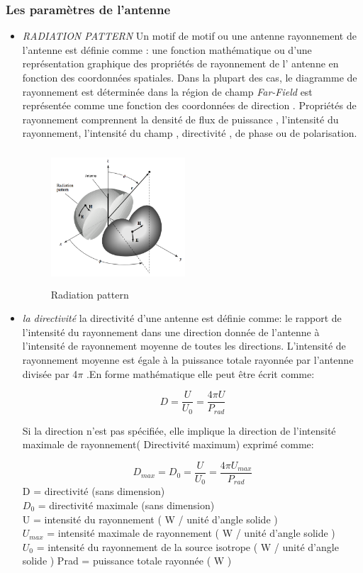 \documentclass[11pt, a4paper, twoside]{book}
\begin{document}
\subsubsection{Les paramètres de l'antenne}
\begin{itemize}
\item \emph{RADIATION PATTERN}
Un motif de motif ou une antenne rayonnement de l'antenne est définie comme : une fonction mathématique ou d'une représentation graphique des propriétés de rayonnement de l' antenne en fonction des coordonnées spatiales. Dans la plupart des cas, le diagramme de rayonnement est déterminée dans la région de champ \emph{Far-Field} est représentée comme une fonction des coordonnées de direction . Propriétés de rayonnement comprennent la densité de flux de puissance , l'intensité du rayonnement, l'intensité du champ , directivité , de phase ou de polarisation.
\begin{figure}[H]
\centering
\includegraphics[width=5cm,height=5cm]{radpa}
\caption{Radiation pattern}
\end{figure}
\item \emph{la directivité} la directivité d'une antenne est définie comme: le rapport de l'intensité du rayonnement dans une direction donnée de l'antenne à l'intensité de rayonnement moyenne de toutes les directions. L'intensité de rayonnement moyenne est égale à la puissance totale rayonnée par l'antenne divisée par 4\(\pi\) .En forme mathématique elle peut être écrit comme:

\begin{equation}
D = \dfrac{U}{U_{0}} = \dfrac{4 \pi U}{P_{rad}}
\end{equation}

Si la direction n'est pas spécifiée, elle implique la direction de l'intensité maximale de rayonnement( Directivité maximum) exprimé comme:

\begin{equation}
D_{max} = D_{0} = \dfrac{U}{U_{0}} = \dfrac{4 \pi U_{max}}{P_{rad}}
\end{equation}
D = directivité (sans dimension)\\
\(D_{0}\) = directivité maximale (sans dimension)\\
U = intensité du rayonnement ( W / unité d'angle solide )\\
\(U_{max}\) = intensité maximale de rayonnement ( W / unité d'angle solide )\\
\(U_{0}\) = intensité du rayonnement de la source isotrope ( W / unité d'angle solide ) Prad = puissance totale rayonnée ( W )\\


\end{itemize}
\end{document}
